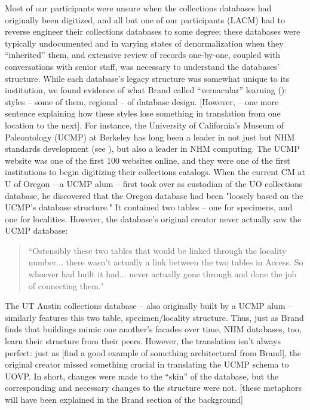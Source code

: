 Most of our participants were unsure when the collections databases had originally been digitized, and all but one of our participants (LACM) had to reverse engineer their collections databases to some degree; these databases were typically undocumented and in varying states of denormalization when they “inherited” them, and extensive review of records one-by-one, coupled with conversations with senior staff, was necessary to understand the databases’ structure.  While each database’s legacy structure was somewhat unique to its institution, we found evidence of what Brand called “vernacular” learning (\cite{brand1995buildings}): styles – some of them, regional – of database design. [However, -- one more sentence explaining how these styles lose something in translation from one location to the next].  For instance, the University of California’s Museum of Paleontology (UCMP) at Berkeley has long been a leader in not just but NHM standards development (see \cite{Star_1989}), but also a leader in NHM computing.  The UCMP website was one of the first 100 websites online, and they were one of the first institutions to begin digitizing their collections catalogs. When the current CM at U of Oregon -- a UCMP alum -- first took over as custodian of the UO collections database, he discovered that the Oregon database had been "loosely based on the UCMP's database structure." It contained two tables -- one for specimens, and one for localities. However, the database’s original creator never actually saw the UCMP database:
\begin{quote}
“Ostensibly these two tables that would be linked through the locality number... there wasn't actually a link between the two tables in Access. So whoever had built it had... never actually gone through and done the job of connecting them."
\end{quote}
The UT Austin collections database – also originally built by a UCMP alum – similarly features this two table, specimen/locality structure. Thus, just as Brand finds that buildings mimic one another’s facades over time, NHM databases, too, learn their structure from their peers. However, the translation isn’t always perfect: just as [find a good example of something architectural from Brand], the original creator missed something crucial in translating the UCMP schema to UOVP. In short, changes were made to the “skin” of the database, but the corresponding and necessary changes to the structure were not. [these metaphors will have been explained in the Brand section of the background] 

